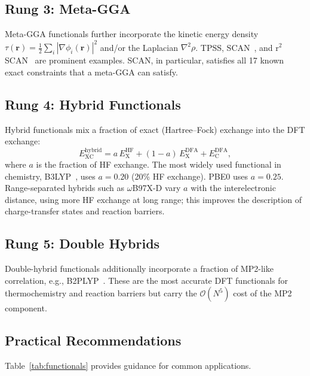 \documentclass[11pt]{article}
\numberwithin{equation}{section}
\begin{document}
\subsection{Rung 3: Meta-GGA}

Meta-GGA functionals further incorporate the kinetic energy density $\tau(\mathbf{r}) = \frac{1}{2}\sum_i |\nabla\phi_i(\mathbf{r})|^2$ and/or the Laplacian $\nabla^2\rho$. TPSS, SCAN~\cite{SCAN2015}, and r$^2$SCAN~\cite{r2SCAN2020} are prominent examples. SCAN, in particular, satisfies all 17 known exact constraints that a meta-GGA can satisfy.

\subsection{Rung 4: Hybrid Functionals}

Hybrid functionals mix a fraction of exact (Hartree--Fock) exchange into the DFT exchange:
\begin{equation}
E_\text{XC}^\text{hybrid} = a\,E_\text{X}^\text{HF} + (1-a)\,E_\text{X}^\text{DFA} + E_\text{C}^\text{DFA},
\end{equation}
where $a$ is the fraction of HF exchange. The most widely used functional in chemistry, B3LYP~\cite{Becke1993,Stephens1994}, uses $a = 0.20$ (20\% HF exchange). PBE0 uses $a = 0.25$. Range-separated hybrids such as $\omega$B97X-D vary $a$ with the interelectronic distance, using more HF exchange at long range; this improves the description of charge-transfer states and reaction barriers.

\subsection{Rung 5: Double Hybrids}

Double-hybrid functionals additionally incorporate a fraction of MP2-like correlation, e.g., B2PLYP~\cite{B2PLYP2006}. These are the most accurate DFT functionals for thermochemistry and reaction barriers but carry the $\mathcal{O}(N^5)$ cost of the MP2 component.

\subsection{Practical Recommendations}

Table~\ref{tab:functionals} provides guidance for common applications.
\end{document}
